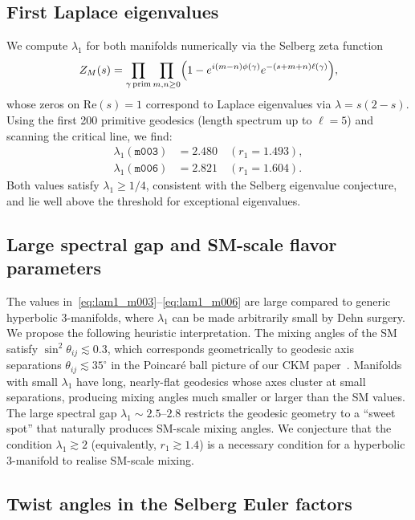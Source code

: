 \documentclass[11pt,a4paper]{article}
\newcommand{\mfld}[1]{\texttt{#1}}
\newcommand{\degr}{^{\circ}}
\begin{document}
\subsection{First Laplace eigenvalues}

We compute $\lambda_1$ for both manifolds numerically via the Selberg zeta
function~\cite{Selberg56}
\begin{equation}
  Z_M(s) = \prod_{\gamma\,\rm prim}\prod_{m,n\geq 0}
  \Bigl(1-e^{i(m-n)\phi(\gamma)}e^{-(s+m+n)\ell(\gamma)}\Bigr),
  \label{eq:selberg}
\end{equation}
whose zeros on $\mathrm{Re}(s)=1$ correspond to Laplace eigenvalues via
$\lambda = s(2-s)$.
Using the first 200 primitive geodesics (length spectrum up to $\ell=5$) and
scanning the critical line, we find:
\begin{align}
  \lambda_1(\mfld{m003}) &= 2.480 \quad (r_1=1.493), \label{eq:lam1_m003}\\
  \lambda_1(\mfld{m006}) &= 2.821 \quad (r_1=1.604). \label{eq:lam1_m006}
\end{align}
Both values satisfy $\lambda_1 \geq 1/4$, consistent with the Selberg eigenvalue
conjecture, and lie well above the threshold for exceptional eigenvalues.

\subsection{Large spectral gap and SM-scale flavor parameters}

The values in~\eqref{eq:lam1_m003}--\eqref{eq:lam1_m006} are large compared
to generic hyperbolic 3-manifolds, where $\lambda_1$ can be made arbitrarily
small by Dehn surgery.
We propose the following heuristic interpretation.
The mixing angles of the SM satisfy
$\sin^2\theta_{ij}\lesssim 0.3$, which corresponds geometrically to
geodesic axis separations $\theta_{ij}\lesssim 35\degr$ in the Poincar\'e
ball picture of our CKM paper~\cite{GentryCKM}.
Manifolds with small $\lambda_1$ have long, nearly-flat geodesics whose
axes cluster at small separations, producing mixing angles much smaller or
larger than the SM values.
The large spectral gap $\lambda_1\sim 2.5$--$2.8$ restricts the geodesic
geometry to a ``sweet spot'' that naturally produces SM-scale mixing angles.
We conjecture that the condition $\lambda_1\gtrsim 2$ (equivalently,
$r_1\gtrsim 1.4$) is a necessary condition for a hyperbolic 3-manifold to
realise SM-scale mixing.

\subsection{Twist angles in the Selberg Euler factors}
\end{document}
